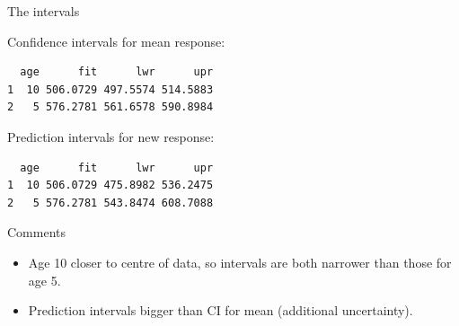 \begin{frame}[fragile]{The intervals}
  
Confidence intervals for mean response:

 
\begin{knitrout}
\color{fgcolor}\begin{kframe}
\begin{alltt}
\end{alltt}
\begin{verbatim}
  age      fit      lwr      upr
1  10 506.0729 497.5574 514.5883
2   5 576.2781 561.6578 590.8984
\end{verbatim}
\end{kframe}
\end{knitrout}

Prediction intervals for new response:

 
\begin{knitrout}
\color{fgcolor}\begin{kframe}
\begin{alltt}
\end{alltt}
\begin{verbatim}
  age      fit      lwr      upr
1  10 506.0729 475.8982 536.2475
2   5 576.2781 543.8474 608.7088
\end{verbatim}
\end{kframe}
\end{knitrout}


  
\end{frame}


\begin{frame}[fragile]{Comments}

\begin{itemize}
\item Age 10 closer to centre of data, so intervals are both narrower than those for age 5.
\item Prediction intervals bigger than CI for mean (additional uncertainty).
\end{itemize}

\end{frame}


